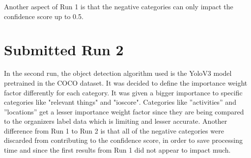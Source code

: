     Another aspect of Run 1 is that the negative categories can only impact the confidence score up to 0.5.
    
 

    \section{Submitted Run 2}
    \label{sec:run2}
    
    In the second run, the object detection algorithm used is the YoloV3 model pretrained in the COCO dataset.  It was decided to define the importance weight factor differently for each category. It was given a bigger importance to specific categories like "relevant things" and "ioscore". Categories like ”activities” and ”locations” get a lesser importance weight factor since they are being compared to the organizers label data which is limiting and lesser accurate.  Another difference from Run 1 to Run 2 is that all of the negative categories were discarded from contributing to the confidence score, in order to save processing time and since the first results from Run 1 did not appear to impact much.
    
